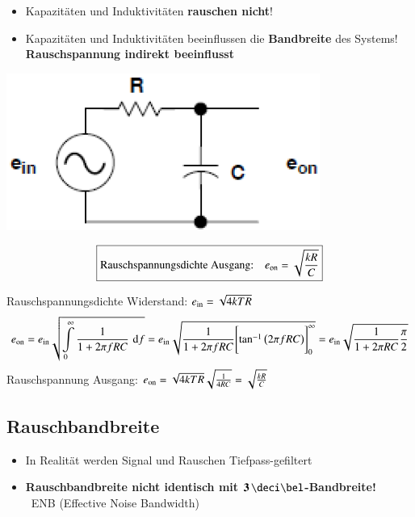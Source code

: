 \begin{itemize}
    \item Kapazitäten und Induktivitäten \textbf{rauschen nicht}!
    \item Kapazitäten und Induktivitäten beeinflussen die \textbf{Bandbreite} des Systems! \\
        \textbf{Rauschspannung indirekt beeinflusst}
\end{itemize}

\begin{minipage}[c]{0.28\columnwidth}
    \includegraphics[width=\columnwidth]{images/rc_rauschen.png}
\end{minipage}
\hfill
\begin{minipage}[c]{0.7\columnwidth}
    $$ \boxed{ \text{Rauschspannungsdichte Ausgang:} \quad e_{\rm on} = \sqrt{\frac{k R }{C}} } $$
\end{minipage}


    
Rauschspannungsdichte Widerstand: $e_{\rm in} = \sqrt{4 k T R}$
$$ e_{\rm on} = e_{\rm in} \sqrt{ \int\limits_{0}^{\infty} \frac{1}{1 + 2 \pi f R C} \, \mathop{} \! \mathrm{d} f }
    = e_{\rm in} \sqrt{\frac{1}{1 + 2 \pi f R C} \Biggl[ \tan^{-1}\big( 2 \pi f R C \big) \Biggr]_{0}^{\infty} } 
    = e_{\rm in} \sqrt{\frac{1}{1 + 2 \pi R C} \frac{\pi}{2} } $$
Rauschspannung Ausgang: \quad $e_{\rm on} = \sqrt{4 k T R} \sqrt{\frac{1}{4 R C}} = \sqrt{\frac{k R }{C}} $


\subsection{Rauschbandbreite}

\begin{itemize}
    \item In Realität werden Signal und Rauschen Tiefpass-gefiltert
    \item \textbf{Rauschbandbreite nicht identisch mit $\bm{3 \, \deci \bel}$-Bandbreite!} \\
        \textrightarrow\ ENB (Effective Noise Bandwidth)
\end{itemize}


